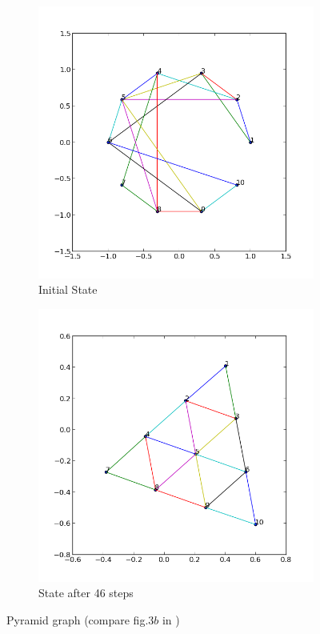 \documentclass[12pt,a4paper]{article}
\begin{document}
\begin{figure}[htb]
	 \begin{subfigure}{0.5\textwidth}
		   \centering
           \includegraphics[scale=0.4]{results_Kawai/ex_triang_before}
           \caption{Initial State}
     \end{subfigure}
	 \begin{subfigure}{0.5\textwidth}
			\centering
           \includegraphics[scale=0.4]{results_Kawai/ex_triang_after}
            \caption{State after 46 steps}
     \end{subfigure}
     \caption{Pyramid graph (compare fig.$3 b$ in \cite{TomihisaKamada1989})}
     \label{fig: triangGraph}
\end{figure}    
\end{document}
